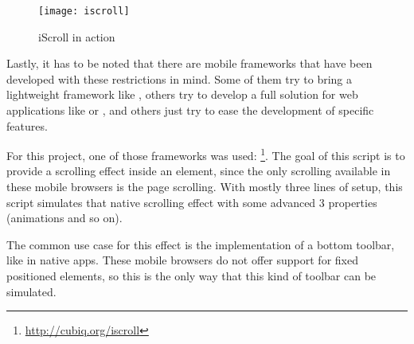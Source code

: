 \begin{wrapfigure}{r}{0.5\textwidth}
  \centering
    \texttt{[image: iscroll]}
  \caption{iScroll in action}
  \label{fig:iscroll}
\end{wrapfigure}

Lastly, it has to be noted that there are mobile  frameworks that have been developed with these restrictions in mind.
Some of them try to bring a lightweight framework like , others try to develop a full solution for web applications like  or , and others just try to ease the development of specific features.

For this project, one of those frameworks was used: \footnote{\url{http://cubiq.org/iscroll}}.
The goal of this script is to provide a scrolling effect inside an element, since the only scrolling available in these mobile browsers is the page scrolling.
With mostly three lines of setup, this script simulates that native scrolling effect with some advanced 3 properties (animations and so on).

The common use case for this effect is the implementation of a bottom toolbar, like in native apps.
These mobile browsers do not offer support for fixed positioned elements, so this is the only way that this kind of toolbar can be simulated.


